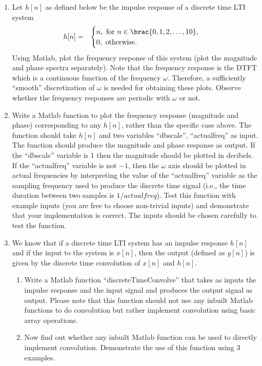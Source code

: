 \begin{enumerate}
\item Let $h[n]$ as defined below be the impulse response of a discrete time LTI system
  \begin{eqnarray*}
    h[n] & = &
    \begin{cases}
      n, \text{ for } n \in \brac{0,1,2,\dots,10}, \\
      0, \text{ otherwise.}
    \end{cases}
  \end{eqnarray*}
  Using Matlab, plot the frequency response of this system (plot the magnitude and phase spectra separately).
  Note that the frequency response is the DTFT which is a continuous function of the frequency $\omega$.
  Therefore, a sufficiently ``smooth'' discretization of $\omega$ is needed for obtaining these plots.
  Observe whether the frequency responses are periodic with $\omega$ or not.
\item Write a Matlab function to plot the frequency response (magnitude and phase) corresponding to any $h[n]$, rather than the specific case above. The function should take $h[n]$ and two variables ``dbscale'', ``actualfreq'' as input. The function should produce the magnitude and phase response as output. If the ``dbscale'' variable is 1 then the magnitude should be plotted in decibels. If the ``actualfreq'' variable is not $-1$, then the $\omega$ axis should be plotted in actual frequencies by interpreting the value of the ``actualfreq'' variable as the sampling frequency used to produce the discrete time signal (i.e., the time duration between two samples is $1/actualfreq$). Test this function with example inputs (you are free to choose non-trivial inputs) and demonstrate that your implementation is correct. The inputs should be chosen carefully to test the function.
\item We know that if a discrete time LTI system has an impulse response $h[n]$ and if the input to the system is $x[n]$, then the output (defined as $y[n]$) is given by the discrete time convolution of $x[n]$ and $h[n]$.
  \begin{enumerate}
  \item Write a Matlab function ``discreteTimeConvolve'' that takes as inputs the impulse response and the input signal and produces the output signal as output. Please note that this function should not use any inbuilt Matlab functions to do convolution but rather implement convolution using basic array operations. 
  \item Now find out whether any inbuilt Matlab function can be used to directly implement convolution. Demonstrate the use of this function using 3 examples.

\end{enumerate}
\end{enumerate}
